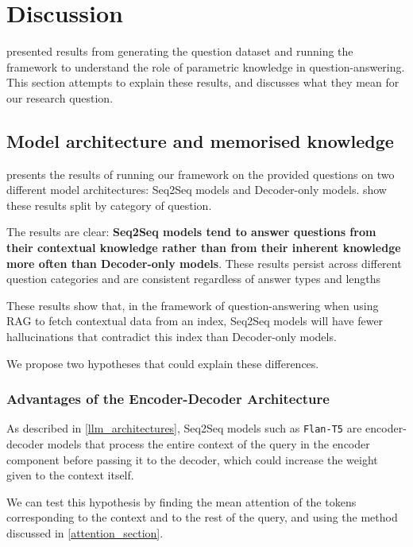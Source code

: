 \section{Discussion}
\label{discussion}

 presented results from generating the question dataset and running the framework to understand the role of parametric knowledge in question-answering.
This section attempts to explain these results, and discusses what they mean for our research question.

\subsection{Model architecture and memorised knowledge}
\label{model_architecture_parametric}

 presents the results of running our framework on the provided questions on two different model architectures: Seq2Seq models and Decoder-only models.
 show these results split by category of question.

The results are clear: \textbf{Seq2Seq models tend to answer questions from their contextual knowledge rather than from their inherent knowledge more often than Decoder-only models}.
These results persist across different question categories and are consistent regardless of answer types and lengths

These results show that, in the framework of question-answering when using RAG to fetch contextual data from an index, Seq2Seq models will have fewer hallucinations that contradict this index than Decoder-only models.

We propose two hypotheses that could explain these differences.

\subsubsection{Advantages of the Encoder-Decoder Architecture}

As described in \cref{llm_architectures}, Seq2Seq models such as \texttt{Flan-T5} are encoder-decoder models that process the entire context of the query in the encoder component before passing it to the decoder, which could increase the weight given to the context itself.

We can test this hypothesis by finding the mean attention of the tokens corresponding to the context and to the rest of the query, and using the method discussed in \cref{attention_section}.

